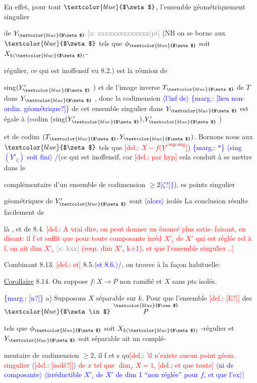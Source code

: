 \documentclass[11pt]{article}
\newcommand{\hand}[1]{\textcolor{blue}{#1}}
\let\over\relax
\newcommand{\over}[2]{\textcolor{gray}{#1}\textcolor{blue}{\ensuremath{^{\!\nearrow}}#2}}
\newcommand{\inserted}[2][]{\textcolor{blue}{$\langle$#2$\rangle$}}
\newcommand{\margin}[1]{\textcolor{blue}{\{\textsf{marg.:} #1\}}}
\newcommand{\deleted}[1]{\textcolor{red}{[\textsf{del.:} #1]}}
\newcommand{\xout}[1]{\textcolor{gray}{[\textsf{x:} #1]}}
\newcommand{\uline}[1]{\underline{#1}}
\newcommand{\unsure}[1]{[#1?]}
\begin{document}
En effet, pour tout $\hand{$\zeta$}$, l'ensemble géométriquement singulier

de $Y_{\hand{$\zeta$}}$ \xout{xxxxxxxxxxxxxx(pt} (NB on se borne aux $\hand{$\zeta$}$ tels que $\phi_{\hand{$\zeta$}}$ soit $X_{k(\hand{$\zeta$})}$-

régulier, ce qui est inoffensif vu 8.2.) est la réunion de

sing$(Y'_{\hand{$\zeta$}}$ ) et de l'image inverse $T_{\hand{$\zeta$}}$ de $T$ dans $Y_{\hand{$\zeta$}}$ , donc la codimension
\inserted[typed]{l'inf de}
\margin{\unsure{lieu non-ordin. géométrique}}
de cet ensemble singulier dans $Y_{\hand{$\zeta$}}$ est égale à \hand{(}codim (sing$(Y'_{\hand{$\zeta$}})$,$Y'_{\hand{$\zeta$}}$ )

et de codim $(T_{\hand{$\zeta$}},Y_{\hand{$\zeta$}})$. Bornons nous aux $\hand{$\zeta$}$ tels que \deleted{$X - f(\underline{Y}'^{\,\mathrm{sup\ sing}}$}\hand{)}
\margin{$*$} \inserted{sing$(Y'_\zeta)$ soit fini}
\hand{/}(ce qui est inoffensif, car \deleted{par hyp} cela conduit à se mettre dans le

complémentaire d'un ensemble de codimension $\geq 2$\hand{\unsure{$\zeta$}$\}$}), \over{l}{L}es points singulier

géométriques de $Y'_{\hand{$\zeta$}}$ sont \inserted{alors} isolés\over{,}{.} La conclusion résulte facilement de

là , et de 8.4. \deleted{A vrai dire, on peut donner un énoncé plus satis-%
faisant, en disant: il f et suffit que pour toute composante irréd
$X'_i$ de $X'$ qui est réglée rel à f, on ait dim $X'_i$ \xout{kxx} (resp. dim $X'_i$
k+1), et que l'ensemble singulier ..}

Combinant 8.13. \deleted{et} 8.5.\inserted[typed]{et 8.6.}\hand{/}, on trouve à la façon habituelle:

\uline{Corollaire} 8.14. On suppose $f:X\rightarrow P$ non ramifié et $X$ sans pts isolés.

\margin{\unsure{n}} a) Supposons $X$ séparable sur $k$. Pour que l'ensemble \deleted{\unsure{E}} des $\hand{$\zeta \in$}$ $\overset{\hand{$\vee$}}{P}$

tels que $\phi_{\hand{$\zeta$}}$ soit $X_{k(\hand{$\zeta$})}$ -régulier et $Y_{\hand{$\zeta$}}$ soit séparable ait un complé-%

mentaire de codimension $\geq 2$, il f et s qu\deleted{'il n'existe aucun point
géom. singulier \inserted{\deleted{\unsure{isolé}}} de $x$ tel que $\dim_x X = 1$, \deleted{et que toute} \inserted{ni de composante}
\inserted{irréductible $X'_i$ de $X'$ de dim 1 ``non réglée'' pour $f$, et que l'ex}}
\end{document}
